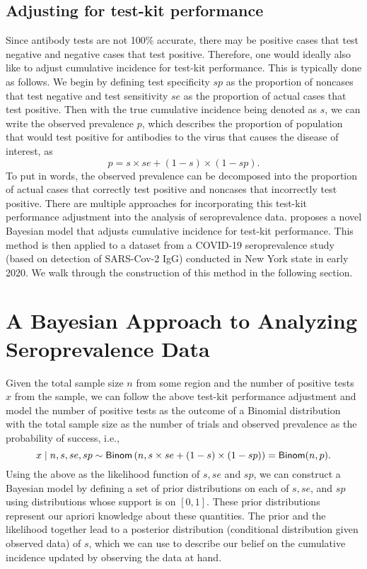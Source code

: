 \subsection{Adjusting for test-kit performance}
Since antibody tests are not 100\% accurate, there may be positive cases that test negative and negative cases that test positive. Therefore, one would ideally also like to adjust cumulative incidence for test-kit performance. This is typically done as follows. We begin by defining test specificity $sp$ as the proportion of noncases that test negative and test sensitivity $se$ as the proportion of actual cases that test positive. Then with the true cumulative incidence being denoted as $s$, we can write the observed prevalence $p$, which describes the proportion of population that would test positive for antibodies to the virus that causes the disease of interest, as
\[
p = s \times se + (1-s) \times (1 - sp).
\]
To put in words, the observed prevalence can be decomposed into the proportion of actual cases that correctly test positive and noncases that incorrectly test positive. There are multiple approaches for incorporating this test-kit performance adjustment into the analysis of seroprevalence data. \cite{meyer2022adjusting} proposes a novel Bayesian model that adjusts cumulative incidence for test-kit performance. This method is then applied to a dataset from a COVID-19 seroprevalence study (based on detection of SARS-Cov-2 IgG) conducted in New York state in early 2020. We walk through the construction of this method in the following section.
\section{A Bayesian Approach to Analyzing Seroprevalence Data}
Given the total sample size $n$ from some region and the number of positive tests $x$ from the sample, we can follow the above test-kit performance adjustment and model the number of positive tests as the outcome of a Binomial distribution with the total sample size as the number of trials and observed prevalence as the probability of success, i.e.,
\[
x \mid n, s, se, sp \sim {\sf{Binom}}\left(n, s \times se + (1-s) \times (1 - sp)\right) = {\sf{Binom}}(n, p).
\]
Using the above as the likelihood function of $s, se$ and $sp$, we can construct a Bayesian model by defining a set of prior distributions on each of $s, se$, and $sp$ using distributions whose support is on $[0,1]$. These prior distributions represent our apriori knowledge about these quantities. The prior and the likelihood together lead to a posterior distribution (conditional distribution given observed data) of $s$, which we can use to describe our belief on the cumulative incidence updated by observing the data at hand. 
